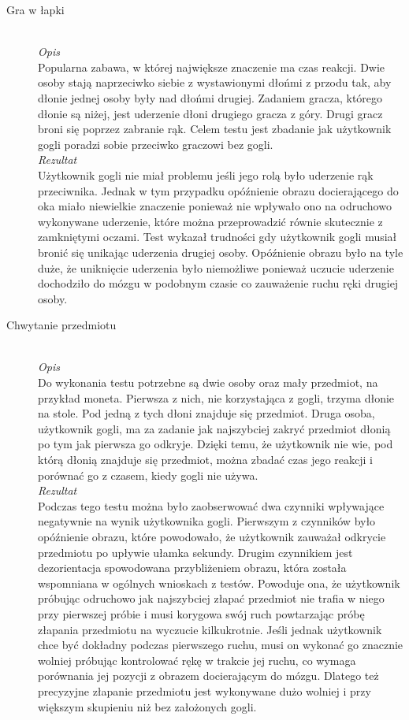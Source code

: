 \documentclass[a4paper,11pt,twoside]{report}
\theoremstyle{definition}
\begin{document}
\begin{description}
\item[Gra w łapki] \hfill \\
\textit{Opis} \\
Popularna zabawa, w której największe znaczenie ma czas reakcji. Dwie osoby stają naprzeciwko siebie z wystawionymi dłońmi z przodu tak, aby dłonie jednej osoby były nad dłońmi drugiej. Zadaniem gracza, którego dłonie są niżej, jest uderzenie dłoni drugiego gracza z góry. Drugi gracz broni się poprzez zabranie rąk. Celem testu jest zbadanie jak użytkownik gogli poradzi sobie przeciwko graczowi bez gogli. \\
\textit{Rezultat}\\
Użytkownik gogli nie miał problemu jeśli jego rolą było uderzenie rąk przeciwnika. Jednak w tym przypadku opóźnienie obrazu docierającego do oka miało niewielkie znaczenie ponieważ nie wpływało ono na odruchowo wykonywane uderzenie, które można przeprowadzić równie skutecznie z zamkniętymi oczami. Test wykazał trudności gdy użytkownik gogli musiał bronić się unikając uderzenia drugiej osoby. Opóźnienie obrazu było na tyle duże, że uniknięcie uderzenia było niemożliwe ponieważ uczucie uderzenie dochodziło do mózgu w podobnym czasie co zauważenie ruchu ręki drugiej osoby.

\item[Chwytanie przedmiotu] \hfill \\
\textit{Opis} \\
Do wykonania testu potrzebne są dwie osoby oraz mały przedmiot, na przykład moneta. Pierwsza z nich, nie korzystająca z gogli, trzyma dłonie na stole. Pod jedną z tych dłoni znajduje się przedmiot. Druga osoba, użytkownik gogli, ma za zadanie jak najszybciej zakryć przedmiot dłonią po tym jak pierwsza go odkryje. Dzięki temu, że użytkownik nie wie, pod którą dłonią znajduje się przedmiot, można zbadać czas jego reakcji i porównać go z czasem, kiedy gogli nie używa. \\
\textit{Rezultat} \\
Podczas tego testu można było zaobserwować dwa czynniki wpływające negatywnie na wynik użytkownika gogli. Pierwszym z czynników było opóźnienie obrazu, które powodowało, że użytkownik zauważał odkrycie przedmiotu po upływie ułamka sekundy. Drugim czynnikiem jest dezorientacja spowodowana przybliżeniem obrazu, która została wspomniana w ogólnych wnioskach z testów. Powoduje ona, że użytkownik próbując odruchowo jak najszybciej złapać przedmiot nie trafia w niego przy pierwszej próbie i musi korygowa swój ruch powtarzając próbę złapania przedmiotu na wyczucie kilkukrotnie. Jeśli jednak użytkownik chce być dokładny podczas pierwszego ruchu, musi on wykonać go znacznie wolniej próbując kontrolować rękę w trakcie jej ruchu, co wymaga porównania jej pozycji z obrazem docierającym do mózgu. Dlatego też precyzyjne złapanie przedmiotu jest wykonywane dużo wolniej i przy większym skupieniu niż bez założonych gogli.


\end{description}
\end{document}
